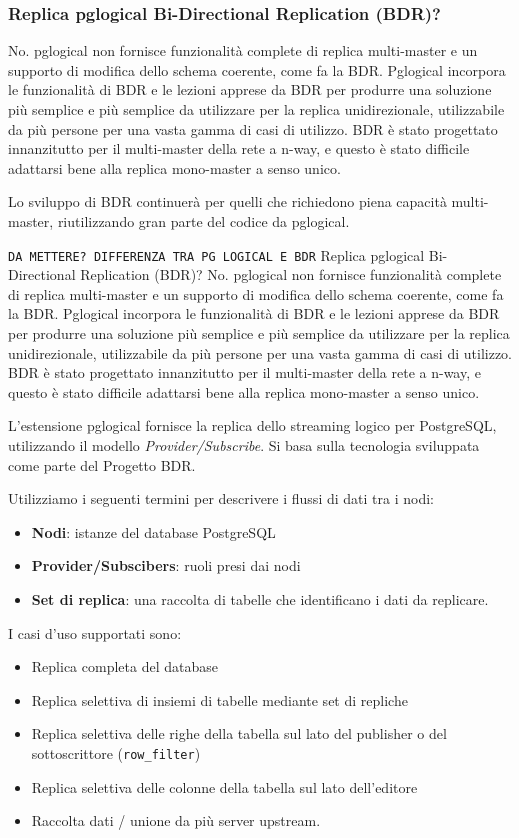 \subsubsection{Replica pglogical Bi-Directional Replication (BDR)?}
No. pglogical non fornisce funzionalità complete di replica multi-master e un supporto di modifica dello schema coerente, come fa la BDR. Pglogical incorpora le funzionalità di BDR e le lezioni apprese da BDR per produrre una soluzione più semplice e più semplice da utilizzare per la replica unidirezionale, utilizzabile da più persone per una vasta gamma di casi di utilizzo. BDR è stato progettato innanzitutto per il multi-master della rete a n-way, e questo è stato difficile adattarsi bene alla replica mono-master a senso unico.

Lo sviluppo di BDR continuerà per quelli che richiedono piena capacità multi-master, riutilizzando gran parte del codice da pglogical.\cite{etichetta3}


\texttt{DA METTERE? DIFFERENZA TRA PG LOGICAL E BDR}
Replica pglogical Bi-Directional Replication (BDR)?
No. pglogical non fornisce funzionalità complete di replica multi-master e un supporto di modifica dello schema coerente, come fa la BDR. Pglogical incorpora le funzionalità di BDR e le lezioni apprese da BDR per produrre una soluzione più semplice e più semplice da utilizzare per la replica unidirezionale, utilizzabile da più persone per una vasta gamma di casi di utilizzo. BDR è stato progettato innanzitutto per il multi-master della rete a n-way, e questo è stato difficile adattarsi bene alla replica mono-master a senso unico.
%

L'estensione pglogical fornisce la replica dello streaming logico per PostgreSQL, utilizzando il modello \textit{Provider/Subscribe}. Si basa sulla tecnologia sviluppata come parte del Progetto BDR.

Utilizziamo i seguenti termini per descrivere i flussi di dati tra i nodi:

\begin{itemize}
\item
\textbf{Nodi}: istanze del database PostgreSQL
\item 
\textbf{Provider/Subscibers}: ruoli presi dai nodi
\item 
\textbf{Set di replica}: una raccolta di tabelle che identificano i dati da replicare.
\end{itemize}


I casi d'uso supportati sono:
\begin{itemize}
\item 
Replica completa del database
\item 
Replica selettiva di insiemi di tabelle mediante set di repliche
\item 
Replica selettiva delle righe della tabella sul lato del publisher o del sottoscrittore (\verb"row_filter")
\item 
Replica selettiva delle colonne della tabella sul lato dell'editore
\item 
Raccolta dati / unione da pi\`{u} server upstream. \cite{etichetta3}
\end{itemize}

